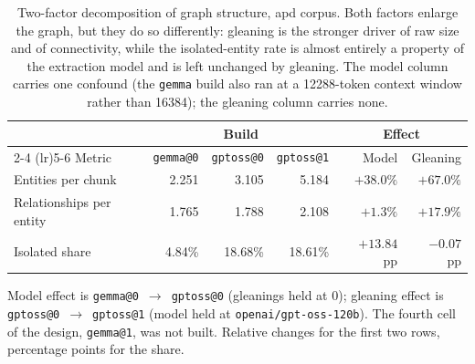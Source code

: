 \begin{table}[htbp]
  \centering
  \caption{Two-factor decomposition of graph structure, apd corpus. Both factors enlarge the graph,
    but they do so differently: gleaning is the stronger driver of raw size and of connectivity,
    while the isolated-entity rate is almost entirely a property of the extraction model and is
    left unchanged by gleaning. The model column carries one confound (the \texttt{gemma} build
    also ran at a 12288-token context window rather than 16384); the gleaning column carries none.}
  \label{tab:graph-two-factor}
  \begin{tabular}{lrrrrr}
    \toprule
    & \multicolumn{3}{c}{Build} & \multicolumn{2}{c}{Effect} \\
    \cmidrule(lr){2-4} \cmidrule(lr){5-6}
    Metric & \texttt{gemma@0} & \texttt{gptoss@0} & \texttt{gptoss@1} & Model & Gleaning \\
    \midrule
    Entities per chunk       & 2.251 & 3.105 & 5.184 & $+38.0\%$ & $+67.0\%$ \\
    Relationships per entity & 1.765 & 1.788 & 2.108 & $+1.3\%$  & $+17.9\%$ \\
    Isolated share           & 4.84\% & 18.68\% & 18.61\% & $+13.84$ pp & $-0.07$ pp \\
    \bottomrule
  \end{tabular}

  \vspace{0.5em}
  \footnotesize
  Model effect is \texttt{gemma@0}~$\rightarrow$~\texttt{gptoss@0} (gleanings held at 0); gleaning
  effect is \texttt{gptoss@0}~$\rightarrow$~\texttt{gptoss@1} (model held at
  \texttt{openai/gpt-oss-120b}). The fourth cell of the design, \texttt{gemma@1}, was not built.
  Relative changes for the first two rows, percentage points for the share.
\end{table}
